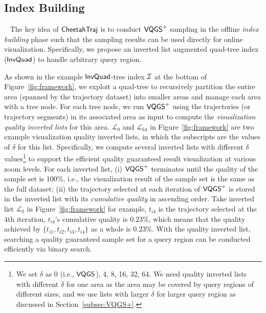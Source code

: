 \subsection{Index Building}~\label{sec:index}
The key idea of $\mathsf{CheetahTraj}$ is to conduct $\mathsf{VQGS}^+$ sampling in the offline \emph{index building} phase such that the sampling results can be used directly for online visualization.
Specifically, we propose an inverted list augmented quad-tree index ($\mathsf{InvQuad}$) to handle arbitrary query region.

As shown in the example $\mathsf{InvQuad}$-tree index $\mathcal{I}$ at the bottom of Figure~\ref{fig:framework}, we exploit a quad-tree to recursively partition the entire area (spanned by the trajectory dataset) into smaller areas and manage each area with a tree node.
For each tree node, we run $\mathsf{VQGS}^+$ using the trajectories (or trajectory segments) in its associated area as input to compute the \textit{visualization quality inverted lists} for this area. $\mathcal{L}_0$ and $\mathcal{L}_{64}$ in Figure~\ref{fig:framework} are two example visualization quality inverted lists, in which the subscripts are the values of $\delta$ for this list.
Specifically, we compute several inverted lists with different $\delta$ values\footnote{We set $\delta$ as 0 (i.e., $\mathsf{VQGS}$), 4, 8, 16, 32, 64. We need quality inverted lists with different $\delta$ for one area as the area may be covered by query regions of different sizes, and we use lists with larger $\delta$ for larger query region as discussed in Section~\ref{subsec:VQGS+}.} to support the efficient quality guaranteed result visualization at various zoom levels.
For each inverted list, (i) $\mathsf{VQGS}^+$ terminates until the quality of the sample set is $100\%$, i.e., the visualization result of the sample set is the same as the full dataset;
(ii) the trajectory selected at each iteration of $\mathsf{VQGS}^+$ is stored in the inverted list with its \textit{cumulative quality} in ascending order. Take inverted list $\mathcal{L}_0$ in Figure~\ref{fig:framework} for example, $t_{i4}$ is the trajectory selected at the $4$th iteration,
$t_{i4}$'s cumulative quality is $0.23\%$, which means that the quality achieved by $\{t_{i1}, t_{i2}, t_{i3}, t_{i4}\}$ as a whole is $0.23\%$. With the quality inverted list, searching a quality guaranteed sample set for a query region can be conducted efficiently via binary search.


